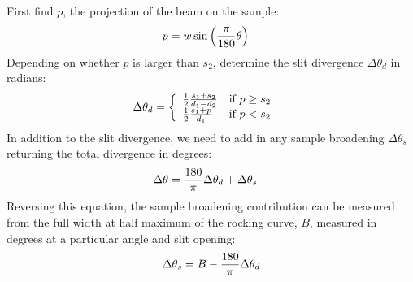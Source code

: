 \documentclass[letterpaper,10pt,english]{sphinxmanual}
\begin{document}
\begin{fulllineitems}
First find $p$, the projection of the beam on the sample:
\begin{gather}
\begin{split}p &= w \sin\left(\frac{\pi}{180}\theta\right)\end{split}\notag
\end{gather}
Depending on whether $p$ is larger than $s_2$, determine the slit
divergence $\Delta\theta_d$ in radians:
\begin{gather}
\begin{split}\Delta\theta_d &= \left\{
  \begin{array}{ll}
    \frac{1}{2}\frac{s_1+s_2}{d_1-d_2} & \mbox{if } p \geq s_2 \\
    \frac{1}{2}\frac{s_1+p}{d_1}       & \mbox{if } p < s_2
  \end{array}
\right.\end{split}\notag
\end{gather}
In addition to the slit divergence, we need to add in any sample
broadening $\Delta\theta_s$ returning the total divergence in degrees:
\begin{gather}
\begin{split}\Delta\theta &= \frac{180}{\pi} \Delta\theta_d + \Delta\theta_s\end{split}\notag
\end{gather}
Reversing this equation, the sample broadening contribution can
be measured from the full width at half maximum of the rocking
curve, $B$, measured in degrees at a particular angle and slit
opening:
\begin{gather}
\begin{split}\Delta\theta_s = B - \frac{180}{\pi}\Delta\theta_d\end{split}\notag
\end{gather}
\end{fulllineitems}


\begin{fulllineitems}
\label{api/resolution:refl1d.resolution.sigma2FWHM}
\end{fulllineitems}

\end{document}
